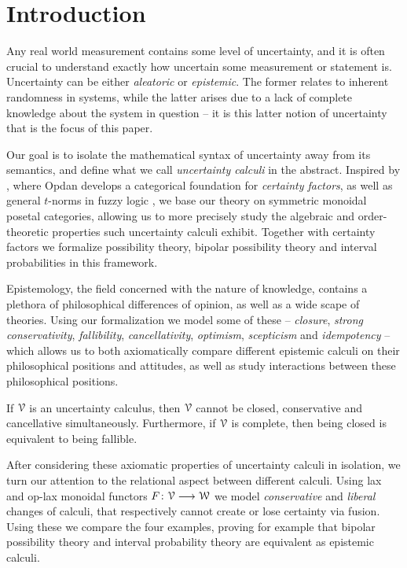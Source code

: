 

\section{Introduction}

Any real world measurement contains some level of uncertainty, and it is often crucial to understand exactly how uncertain some measurement or statement is. Uncertainty can be either \emph{aleatoric} or \emph{epistemic}. The former relates to inherent randomness in systems, while the latter arises due to a lack of complete knowledge about the system in question -- it is this latter notion of uncertainty that is the focus of this paper. 

Our goal is to isolate the mathematical syntax of uncertainty away from its semantics, and define what we call \emph{uncertainty calculi} in the abstract. Inspired by \cite{opdan_2025}, where Opdan develops a categorical foundation for \emph{certainty factors}, as well as general $t$-norms in fuzzy logic \cite{zadeh_1965, klement-mesiar-pap_2000}, we base our theory on symmetric monoidal posetal categories, allowing us to more precisely study the algebraic and order-theoretic properties such uncertainty calculi exhibit. Together with certainty factors we formalize possibility theory, bipolar possibility theory and interval probabilities in this framework. 

Epistemology, the field concerned with the nature of knowledge, contains a plethora of philosophical differences of opinion, as well as a wide scape of theories. Using our formalization we model some of these -- \emph{closure}, \emph{strong conservativity}, \emph{fallibility}, \emph{cancellativity}, \emph{optimism}, \emph{scepticism} and \emph{idempotency} -- which allows us to both axiomatically compare different epistemic calculi on their philosophical positions and attitudes, as well as study interactions between these philosophical positions. 

\begin{introthm}
    If $\EuScript{V}$ is an uncertainty calculus, then $\EuScript{V}$ cannot be closed, conservative and cancellative simultaneously. Furthermore, if $\EuScript{V}$ is complete, then being closed is equivalent to being fallible. 
\end{introthm}

After considering these axiomatic properties of uncertainty calculi in isolation, we turn our attention to the relational aspect between different calculi. Using lax and op-lax monoidal functors $F\colon \EuScript{V} \longrightarrow \EuScript{W}$ we model \emph{conservative} and \emph{liberal} changes of calculi, that respectively cannot create or lose certainty via fusion. Using these we compare the four examples, proving for example that bipolar possibility theory and interval probability theory are equivalent as epistemic calculi. 

